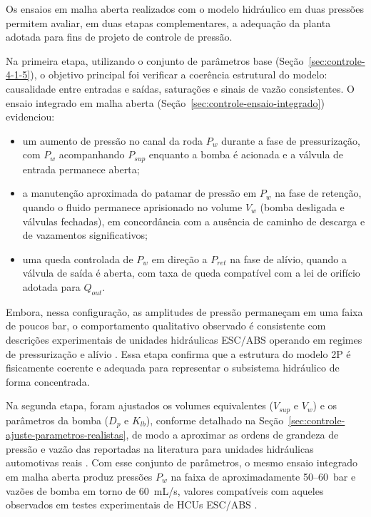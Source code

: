 Os ensaios em malha aberta realizados com o modelo hidráulico em duas pressões permitem avaliar, em duas etapas complementares, a adequação da planta adotada para fins de projeto de controle de pressão.

Na primeira etapa, utilizando o conjunto de parâmetros base (Seção~\ref{sec:controle-4-1-5}), o objetivo principal foi verificar a coerência estrutural do modelo: causalidade entre entradas e saídas, saturações e sinais de vazão consistentes. O ensaio integrado em malha aberta (Seção~\ref{sec:controle-ensaio-integrado}) evidenciou:

\begin{itemize}
    \item um aumento de pressão no canal da roda $P_w$ durante a fase de pressurização, com $P_w$ acompanhando $P_{sup}$ enquanto a bomba é acionada e a válvula de entrada permanece aberta;

    \item a manutenção aproximada do patamar de pressão em $P_w$ na fase de retenção, quando o fluido permanece aprisionado no volume $V_w$ (bomba desligada e válvulas fechadas), em concordância com a ausência de caminho de descarga e de vazamentos significativos;

    \item uma queda controlada de $P_w$ em direção a $P_{ret}$ na fase de alívio, quando a válvula de saída é aberta, com taxa de queda compatível com a lei de orifício adotada para $Q_{out}$.
\end{itemize}

Embora, nessa configuração, as amplitudes de pressão permaneçam em uma faixa de poucos bar, o comportamento qualitativo observado é consistente com descrições experimentais de unidades hidráulicas ESC/ABS operando em regimes de pressurização e alívio \cite{ZengYangHuang2023,DesignESCUnitTestSystem2018,HouhuaJing2022,Lv2014}. Essa etapa confirma que a estrutura do modelo 2P é fisicamente coerente e adequada para representar o subsistema hidráulico de forma concentrada.

Na segunda etapa, foram ajustados os volumes equivalentes ($V_{sup}$ e $V_w$) e os parâmetros da bomba ($D_p$ e $K_{lb}$), conforme detalhado na Seção~\ref{sec:controle-ajuste-parametros-realistas}, de modo a aproximar as ordens de grandeza de pressão e vazão das reportadas na literatura para unidades hidráulicas automotivas reais \cite{ZengYangHuang2023,ProportionalPressureABS2023,ChenLv2017,MotorParametricDesign2023}. Com esse conjunto de parâmetros, o mesmo ensaio integrado em malha aberta produz pressões $P_w$ na faixa de aproximadamente 50–60~bar e vazões de bomba em torno de 60~mL/s, valores compatíveis com aqueles observados em testes experimentais de HCUs ESC/ABS \cite{ZengYangHuang2023,DesignESCUnitTestSystem2018,HouhuaJing2022}.

